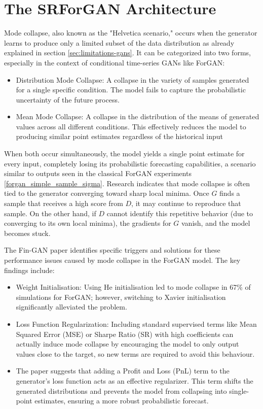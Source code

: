 \section{The SRForGAN Architecture}
Mode collapse, also known as the "Helvetica scenario," 
occurs when the generator learns to produce only a 
limited subset of the data distribution as already explained in section \ref{sec:limitations-gans}. 
It can be categorized into two forms, especially in the context of 
conditional time-series GANs like ForGAN:
\begin{itemize}
    \item Distribution Mode Collapse: A collapse in the variety of samples generated for a single specific condition. The model fails to capture the probabilistic uncertainty of the future process.
    \item Mean Mode Collapse: A collapse in the distribution of the means of generated values across all different conditions. This effectively reduces the model to producing similar point estimates regardless of the historical input
\end{itemize}

When both occur simultaneously, 
the model yields a single point estimate for every input, 
completely losing its probabilistic forecasting capabilities, a scenario similar to outputs seen in the classical ForGAN experiments \ref{forgan_simple_sample_sigma}. 
Research indicates that mode collapse is often tied to the generator
converging toward sharp local minima. 
Once $G$ finds a sample that receives a high score from $D$,
it may continue to reproduce that sample. 
On the other hand,
if $D$ cannot identify this repetitive behavior (due to converging to its own local minima), 
the gradients for $G$ vanish, and the model becomes stuck.



The Fin-GAN paper \cite{forgan:fin_gan} identifies specific triggers and solutions for these performance issues caused by mode collapse in the ForGAN model. The key findings include:
\begin{itemize}
    \item Weight Initialisation: Using He initialisation led to mode collapse in 67\% of simulations for ForGAN; however, switching to Xavier initialisation significantly alleviated the problem.
    \item Loss Function Regularization: Including standard supervised terms like Mean Squared Error (MSE) or Sharpe Ratio (SR) with high coefficients can actually induce mode collapse by encouraging the model to only output values close to the target, so new terms are required to avoid this behaviour.
    \item The paper suggests that adding a Profit and Loss (PnL) term to the generator's loss function acts as an effective regularizer. This term shifts the generated distributions and prevents the model from collapsing into single-point estimates, ensuring a more robust probabilistic forecast.
\end{itemize}

